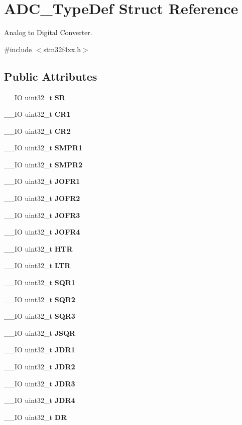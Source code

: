\section{A\+D\+C\+\_\+\+Type\+Def Struct Reference}
\label{structADC__TypeDef}


Analog to Digital Converter.  




{\ttfamily \#include $<$stm32f4xx.\+h$>$}

\subsection*{Public Attributes}
\begin{DoxyCompactItemize}
\item 
\+\_\+\+\_\+\+IO uint32\+\_\+t \textbf{ SR}
\item 
\+\_\+\+\_\+\+IO uint32\+\_\+t \textbf{ C\+R1}
\item 
\+\_\+\+\_\+\+IO uint32\+\_\+t \textbf{ C\+R2}
\item 
\+\_\+\+\_\+\+IO uint32\+\_\+t \textbf{ S\+M\+P\+R1}
\item 
\+\_\+\+\_\+\+IO uint32\+\_\+t \textbf{ S\+M\+P\+R2}
\item 
\+\_\+\+\_\+\+IO uint32\+\_\+t \textbf{ J\+O\+F\+R1}
\item 
\+\_\+\+\_\+\+IO uint32\+\_\+t \textbf{ J\+O\+F\+R2}
\item 
\+\_\+\+\_\+\+IO uint32\+\_\+t \textbf{ J\+O\+F\+R3}
\item 
\+\_\+\+\_\+\+IO uint32\+\_\+t \textbf{ J\+O\+F\+R4}
\item 
\+\_\+\+\_\+\+IO uint32\+\_\+t \textbf{ H\+TR}
\item 
\+\_\+\+\_\+\+IO uint32\+\_\+t \textbf{ L\+TR}
\item 
\+\_\+\+\_\+\+IO uint32\+\_\+t \textbf{ S\+Q\+R1}
\item 
\+\_\+\+\_\+\+IO uint32\+\_\+t \textbf{ S\+Q\+R2}
\item 
\+\_\+\+\_\+\+IO uint32\+\_\+t \textbf{ S\+Q\+R3}
\item 
\+\_\+\+\_\+\+IO uint32\+\_\+t \textbf{ J\+S\+QR}
\item 
\+\_\+\+\_\+\+IO uint32\+\_\+t \textbf{ J\+D\+R1}
\item 
\+\_\+\+\_\+\+IO uint32\+\_\+t \textbf{ J\+D\+R2}
\item 
\+\_\+\+\_\+\+IO uint32\+\_\+t \textbf{ J\+D\+R3}
\item 
\+\_\+\+\_\+\+IO uint32\+\_\+t \textbf{ J\+D\+R4}
\item 
\+\_\+\+\_\+\+IO uint32\+\_\+t \textbf{ DR}
\end{DoxyCompactItemize}


